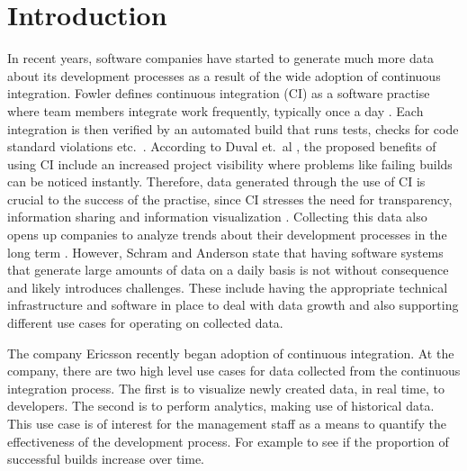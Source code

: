 \chapter{Introduction}

In recent years, software companies have started to generate much more data about its development processes as a result of the wide adoption of continuous integration. Fowler \cite{FowlerCI} defines continuous integration (CI) as a software practise where team members integrate work frequently, typically once a day \cite{FowlerCI}. Each integration is then verified by an automated build that runs tests, checks for code standard violations etc.\ \cite{FowlerCI}. According to Duval et.\ al \cite{CIbook}, the proposed benefits of using CI include an increased project visibility where problems like failing builds can be noticed instantly. Therefore, data generated through the use of CI is crucial to the success of the practise, since CI stresses the need for transparency, information sharing and information visualization \cite{FowlerCI, CIbook}. Collecting this data also opens up companies to analyze trends about their development processes in the long term \cite{bigDataMane, CIbook}. However, Schram and Anderson \cite{MySQLToNoSQL} state that having software systems that generate large amounts of data on a daily basis is not without consequence and likely introduces challenges. These include having the appropriate technical infrastructure and software in place to deal with data growth and also supporting different use cases for operating on collected data.  

The company Ericsson recently began adoption of continuous integration. At the company, there are two high level use cases for data collected from the continuous integration process. The first is to visualize newly created data, in real time, to developers. The second is to perform analytics, making use of historical data. This use case is of interest for the management staff as a means to quantify the effectiveness of the development process. For example to see if the proportion of successful builds increase over time.



